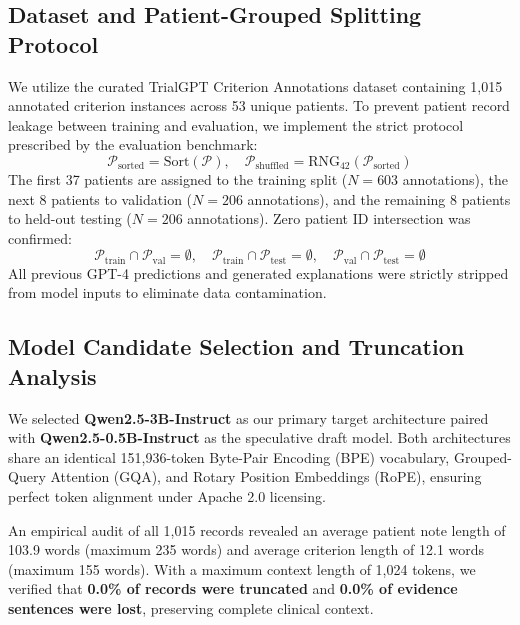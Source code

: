 \documentclass[conference]{IEEEtran}
\begin{document}
\subsection{Dataset and Patient-Grouped Splitting Protocol}
We utilize the curated TrialGPT Criterion Annotations dataset containing 1,015 annotated criterion instances across 53 unique patients. To prevent patient record leakage between training and evaluation, we implement the strict protocol prescribed by the evaluation benchmark:
\begin{equation}
    \mathcal{P}_{\text{sorted}} = \text{Sort}(\mathcal{P}), \quad \mathcal{P}_{\text{shuffled}} = \text{RNG}_{42}(\mathcal{P}_{\text{sorted}})
\end{equation}
The first 37 patients are assigned to the training split ($N=603$ annotations), the next 8 patients to validation ($N=206$ annotations), and the remaining 8 patients to held-out testing ($N=206$ annotations). Zero patient ID intersection was confirmed:
\begin{equation}
    \mathcal{P}_{\text{train}} \cap \mathcal{P}_{\text{val}} = \emptyset, \quad \mathcal{P}_{\text{train}} \cap \mathcal{P}_{\text{test}} = \emptyset, \quad \mathcal{P}_{\text{val}} \cap \mathcal{P}_{\text{test}} = \emptyset
\end{equation}
All previous GPT-4 predictions and generated explanations were strictly stripped from model inputs to eliminate data contamination.

\subsection{Model Candidate Selection and Truncation Analysis}
We selected \textbf{Qwen2.5-3B-Instruct} as our primary target architecture paired with \textbf{Qwen2.5-0.5B-Instruct} as the speculative draft model. Both architectures share an identical 151,936-token Byte-Pair Encoding (BPE) vocabulary, Grouped-Query Attention (GQA), and Rotary Position Embeddings (RoPE), ensuring perfect token alignment under Apache 2.0 licensing.

An empirical audit of all 1,015 records revealed an average patient note length of 103.9 words (maximum 235 words) and average criterion length of 12.1 words (maximum 155 words). With a maximum context length of 1,024 tokens, we verified that \textbf{0.0\% of records were truncated} and \textbf{0.0\% of evidence sentences were lost}, preserving complete clinical context.
\end{document}
